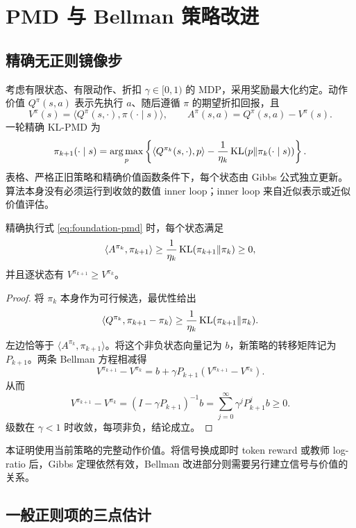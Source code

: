 \section{PMD 与 Bellman 策略改进}

\subsection{精确无正则镜像步}

考虑有限状态、有限动作、折扣 $\gamma\in[0,1)$ 的 MDP，采用奖励最大化约定。动作价值 $Q^\pi(s,a)$ 表示先执行 $a$、随后遵循 $\pi$ 的期望折扣回报，且
\[
 V^\pi(s)=\langle Q^\pi(s,\cdot),\pi(\cdot\mid s)\rangle,
 \qquad A^\pi(s,a)=Q^\pi(s,a)-V^\pi(s).
\]
一轮精确 KL-PMD 为
\begin{equation}
 \pi_{k+1}(\cdot\mid s)=\operatorname*{arg\,max}_p
 \left\{\langle Q^{\pi_k}(s,\cdot),p\rangle
       -\frac1{\eta_k}\operatorname{KL}(p\Vert\pi_k(\cdot\mid s))\right\}.
 \label{eq:foundation-pmd}
\end{equation}
表格、严格正旧策略和精确价值函数条件下，每个状态由 Gibbs 公式独立更新。算法本身没有必须运行到收敛的数值 inner loop；inner loop 来自近似表示或近似价值评估。

\begin{proposition}
\label{prop:foundation-pmd-improvement}
精确执行式 \eqref{eq:foundation-pmd} 时，每个状态满足
\[
 \langle A^{\pi_k},\pi_{k+1}\rangle
 \geq\frac1{\eta_k}\operatorname{KL}(\pi_{k+1}\Vert\pi_k)\geq0,
\]
并且逐状态有 $V^{\pi_{k+1}}\geq V^{\pi_k}$。
\end{proposition}
\begin{proof}
将 $\pi_k$ 本身作为可行候选，最优性给出
\[
 \langle Q^{\pi_k},\pi_{k+1}-\pi_k\rangle
 \geq\frac1{\eta_k}\operatorname{KL}(\pi_{k+1}\Vert\pi_k).
\]
左边恰等于 $\langle A^{\pi_k},\pi_{k+1}\rangle$。将这个非负状态向量记为 $b$，新策略的转移矩阵记为 $P_{k+1}$。两条 Bellman 方程相减得
\[
 V^{\pi_{k+1}}-V^{\pi_k}=b+\gamma P_{k+1}(V^{\pi_{k+1}}-V^{\pi_k}).
\]
从而
\[
 V^{\pi_{k+1}}-V^{\pi_k}
 =(I-\gamma P_{k+1})^{-1}b
 =\sum_{j=0}^\infty\gamma^jP_{k+1}^jb\geq0.
\]
级数在 $\gamma<1$ 时收敛，每项非负，结论成立。
\end{proof}

本证明使用当前策略的完整动作价值。将信号换成即时 token reward 或教师 log-ratio 后，Gibbs 定理依然有效，Bellman 改进部分则需要另行建立信号与价值的关系。

\subsection{一般正则项的三点估计}

